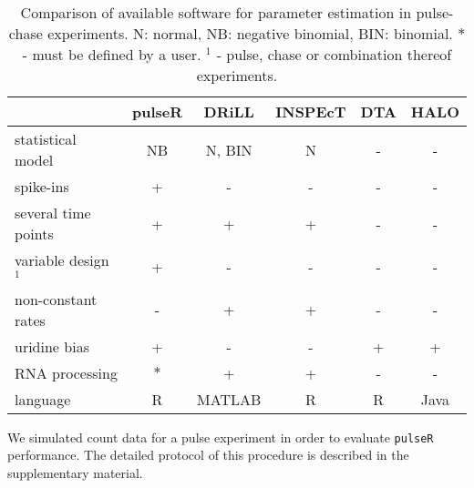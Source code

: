 \begin{table}[tbh]
 \begin{tabular}{|l|c|c|c|c|c|}\hline
                        &pulseR &DRiLL          &INSPEcT&DTA    &HALO       \\\hline
 statistical model      & NB    &N, BIN         &N       & -    & -      \\\hline                         
 spike-ins              & +     &   -           &  -     &  -    & -         \\\hline               
 several time points    & +     &   +           &  +     &  -    & -         \\\hline                    
  variable design $^1$       & +     &   -           &  -     &  -    & -         \\\hline 
 non-constant rates     & -     &   +           &  +     &  -    & -         \\\hline 
            uridine bias& +     &   -           &  -     &  +    & +         \\\hline 
       RNA processing   &$\ast$ &   +           &  +     &  -    & -         \\\hline 
  language              & R     &MATLAB         &  R     &  R    & Java      \\\hline 
 \end{tabular}
\caption{Comparison of available software for parameter estimation in 
pulse-chase experiments. N: normal, NB: negative binomial, BIN: binomial.
$\ast$ - must be defined by a user. $^1$ - pulse, chase or combination thereof experiments.
}
\end{table}
We simulated count data for a pulse experiment 
in order to evaluate \verb|pulseR| performance.
The  detailed protocol of this procedure is described in the supplementary material.

